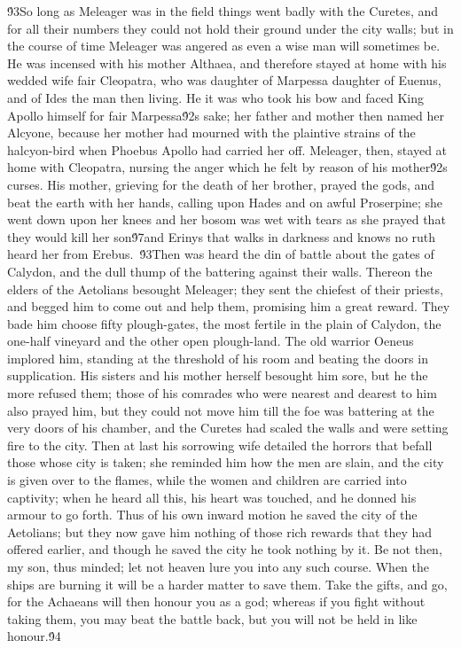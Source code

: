 {\'93So long as Meleager was in the field things went badly with the Curetes, and for all their numbers they could not hold their ground under the city walls; but in the course of time Meleager was angered as even a wise man will sometimes be. He was incensed with his mother Althaea, and therefore stayed at home with his wedded wife fair Cleopatra, who was daughter of Marpessa daughter of Euenus, and of Ides the man then living. He it was who took his bow and faced King Apollo himself for fair Marpessa\'92s sake; her father and mother then named her Alcyone, because her mother had mourned with the plaintive strains of the halcyon-bird when Phoebus Apollo had carried her off. Meleager, then, stayed at home with Cleopatra, nursing the anger which he felt by reason of his mother\'92s curses. His mother, grieving for the death of her brother, prayed the gods, and beat the earth with her hands, calling upon Hades and on awful Proserpine; she went down upon her knees and her bosom was wet with tears as she prayed that they would kill her son\'97and Erinys that walks in darkness and knows no ruth heard her from Erebus.\
\'93Then was heard the din of battle about the gates of Calydon, and the dull thump of the battering against their walls. Thereon the elders of the Aetolians besought Meleager; they sent the chiefest of their priests, and begged him to come out and help them, promising him a great reward. They bade him choose fifty plough-gates, the most fertile in the plain of Calydon, the one-half vineyard and the other open plough-land. The old warrior Oeneus implored him, standing at the threshold of his room and beating the doors in supplication. His sisters and his mother herself besought him sore, but he the more refused them; those of his comrades who were nearest and dearest to him also prayed him, but they could not move him till the foe was battering at the very doors of his chamber, and the Curetes had scaled the walls and were setting fire to the city. Then at last his sorrowing wife detailed the horrors that befall those whose city is taken; she reminded him how the men are slain, and the city is given over to the flames, while the women and children are carried into captivity; when he heard all this, his heart was touched, and he donned his armour to go forth. Thus of his own inward motion he saved the city of the Aetolians; but they now gave him nothing of those rich rewards that they had offered earlier, and though he saved the city he took nothing by it. Be not then, my son, thus minded; let not heaven lure you into any such course. When the ships are burning it will be a harder matter to save them. Take the gifts, and go, for the Achaeans will then honour you as a god; whereas if you fight without taking them, you may beat the battle back, but you will not be held in like honour.\'94\
}
